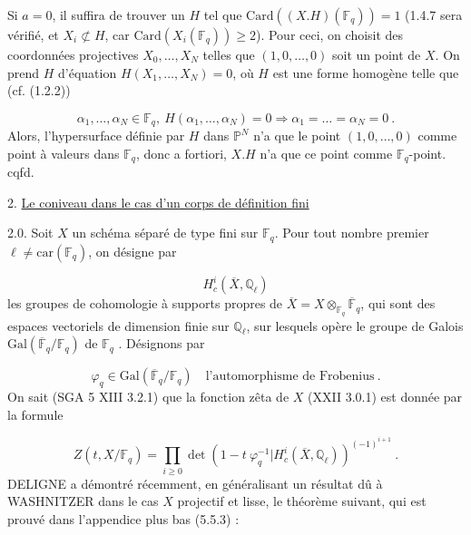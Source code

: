Si $a = 0$, il suffira de trouver un $H$ tel que $\mathrm{Card}((X.H)(\mathbb{F}_q))=1$ (1.4.7 sera vérifié, et $X_i \not\subset H$, car $\mathrm{Card}(X_i(\mathbb{F}_q)) \geq 2$). Pour ceci, on choisit des coordonnées projectives $X_0,\dots,X_N$ telles que $(1,0,\dots,0)$ soit un point de $X$. On prend $H$ d'équation $H(X_1,\dots,X_N) = 0$, où $H$ est une forme homogène telle que (cf. (1.2.2))

\begin{equation}\tag{1.4.8}
\alpha_1,\dots,\alpha_N \in \mathbb{F}_q, \ H(\alpha_1,\dots,\alpha_N) = 0 \Longrightarrow \alpha_1=\dots=\alpha_N = 0 \ .
\end{equation}
Alors, l'hypersurface définie par $H$ dans $\mathbb{P}^N$ n'a que le point $(1,0,\dots,0)$ comme point à valeurs dans $\mathbb{F}_q$, donc a fortiori, $X.H$ n'a que ce point comme $\mathbb{F}_q$-point. cqfd.




2. \underline{Le coniveau dans le cas d'un corps de définition fini}

2.0. Soit $X$ un schéma séparé de type fini sur $\mathbb{F}_q$. Pour tout nombre premier $\ell \neq \mathrm{car}(\mathbb{F}_q)$, on désigne par

\begin{equation}\tag{2.0.1}
H^i_c(\overline{X},\mathbb{Q}_\ell)
\end{equation}
les groupes de cohomologie à supports propres de $\overline{X} = X \otimes_{\mathbb{F}_q} \overline{\mathbb{F}}_q$, qui sont des espaces vectoriels de dimension finie sur $\mathbb{Q}_\ell$, sur lesquels opère le groupe de Galois $\mathrm{Gal}(\overline{\mathbb{F}}_q/\mathbb{F}_q)$ de $\mathbb{F}_q$ . Désignons par

\begin{equation}\tag{2.0.2}
\varphi_q \in \mathrm{Gal}(\overline{\mathbb{F}}_q/\mathbb{F}_q) \quad \mbox{l'automorphisme de Frobenius} \ .
\end{equation}
On sait (SGA 5 XIII 3.2.1) que la fonction zêta de $X$ (XXII 3.0.1) est donnée par la formule

\begin{equation}\tag{2.0.3}
Z(t,X/\mathbb{F}_q) = \prod_{i \geq 0} \det (1-t\ \varphi_q^{-1}|H^i_c(\overline{X},\mathbb{Q}_\ell))^{(-1)^{i+1}} \ .
\end{equation}
DELIGNE a démontré récemment, en généralisant un résultat dû à WASHNITZER dans le cas $X$ projectif et lisse, le théorème suivant, qui est prouvé dans l'appendice plus bas (5.5.3) :


